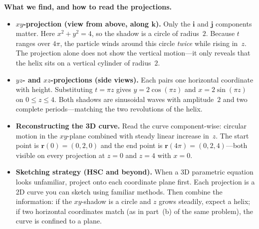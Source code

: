 \vspace{0.5em}
\noindent\textbf{What we find, and how to read the projections.}

\begin{itemize}[leftmargin=*,itemsep=0.25em]
  \item \textbf{$xy$-projection (view from above, along $\mathbf{k}$).}
  Only the $\mathbf{i}$ and $\mathbf{j}$ components matter. Here $x^2+y^2=4$, so the shadow is a circle of radius~$2$. Because $t$ ranges over $4\pi$, the particle winds around this circle \emph{twice} while rising in~$z$. The projection alone does not show the vertical motion---it only reveals that the helix sits on a vertical cylinder of radius~$2$.

  \item \textbf{$yz$- and $xz$-projections (side views).}
  Each pairs one horizontal coordinate with height. Substituting $t=\pi z$ gives $y=2\cos(\pi z)$ and $x=2\sin(\pi z)$ on $0\le z\le 4$. Both shadows are sinusoidal waves with amplitude~$2$ and two complete periods---matching the two revolutions of the helix.

  \item \textbf{Reconstructing the 3D curve.}
  Read the curve component-wise: circular motion in the $xy$-plane combined with steady linear increase in~$z$. The start point is $\mathbf{r}(0)=(0,2,0)$ and the end point is $\mathbf{r}(4\pi)=(0,2,4)$---both visible on every projection at $z=0$ and $z=4$ with $x=0$.

  \item \textbf{Sketching strategy (HSC and beyond).}
  When a 3D parametric equation looks unfamiliar, project onto each coordinate plane first. Each projection is a 2D curve you can sketch using familiar methods. Then combine the information: if the $xy$-shadow is a circle and $z$ grows steadily, expect a helix; if two horizontal coordinates match (as in part~(b) of the same problem), the curve is confined to a plane.
\end{itemize}

\endgroup

